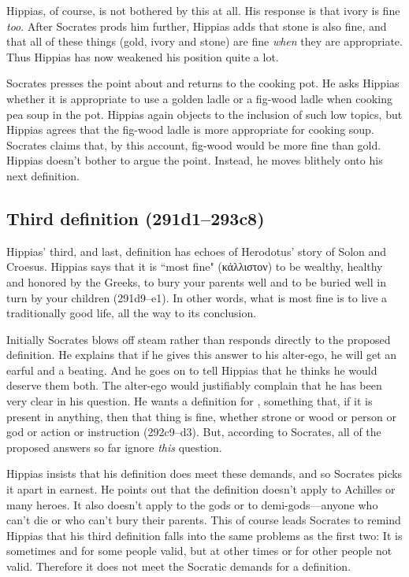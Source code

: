 \documentclass[11pt]{article}
\begin{document}
Hippias, of course, is not bothered by this at all.  His response is that ivory is fine \emph{too}.  After Socrates prods him further, Hippias adds that stone is also fine, and that all of these things (gold, ivory and stone) are fine \emph{when} they are appropriate.  Thus Hippias has now weakened his position quite a lot.

Socrates presses the point about  and returns to the cooking pot.  He asks Hippias whether it is appropriate to use a golden ladle or a fig-wood ladle when cooking pea soup in the pot.  Hippias again objects to the inclusion of such low topics, but Hippias agrees that the fig-wood ladle is more appropriate for cooking soup.  Socrates claims that, by this account, fig-wood would be more fine than gold.  Hippias doesn't bother to argue the point.  Instead, he moves blithely onto his next definition.


\subsection{Third definition (291d1--293c8)}

Hippias' third, and last, definition has echoes of Herodotus' story of Solon and Croesus.  Hippias says that it is ``most fine" (κάλλιστον) to be wealthy, healthy and honored by the Greeks, to bury your parents well and to be buried well in turn by your children (291d9--e1).  In other words, what is most fine is to live a traditionally good life, all the way to its conclusion.

Initially Socrates blows off steam rather than responds directly to the proposed definition.  He explains that if he gives this answer to his alter-ego, he will get an earful and a beating.  And he goes on to tell Hippias that he thinks he would deserve them both.  The alter-ego would justifiably complain that he has been very clear in his question. He wants a definition for , something that, if it is present in anything, then that thing is fine, whether strone or wood or person or god or action or instruction (292c9--d3).  But, according to Socrates, all of the proposed answers so far ignore \emph{this} question.

Hippias insists that his definition does meet these demands, and so Socrates picks it apart in earnest.  He points out that the definition doesn't apply to Achilles or many heroes.  It also doesn't apply to the gods or to demi-gods---anyone who can't die or who can't bury their parents.  This of course leads Socrates to remind Hippias that his third definition falls into the same problems as the first two: It is sometimes and for some people valid, but at other times or for other people not valid.  Therefore it does not meet the Socratic demands for a definition.
\end{document}
